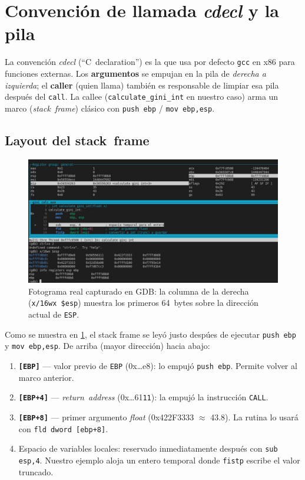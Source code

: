 \documentclass[a4paper,12pt]{article}
\begin{document}
\section{Convención de llamada \emph{cdecl} y la pila}
La convención \emph{cdecl} (``C declaration'') es la que usa por defecto
\texttt{gcc} en x86 para funciones externas.  
Los \textbf{argumentos} se empujan en la pila de \emph{derecha a izquierda};
el \textbf{caller} (quien llama) también es responsable de limpiar esa pila
después del \texttt{call}.  
La callee (\texttt{calculate\_gini\_int} en nuestro caso) arma un marco
(\emph{stack frame}) clásico con \texttt{push ebp} / \texttt{mov ebp,esp}.

\subsection{Layout del stack frame}
\begin{figure}[H]
  \centering
  \includegraphics[width=.9\textwidth]{images/stack_frame.jpeg}
  \caption{Fotograma real capturado en GDB: la columna de la derecha
           (\texttt{x/16wx \$esp}) muestra los primeros 64~bytes sobre la
           dirección actual de \texttt{ESP}.}\label{fig:layout_frame}
\end{figure}

Como se muestra en \cref{fig:layout_frame}, el stack frame se leyó justo despúes de ejecutar
\lstinline{push ebp} y \lstinline{mov ebp,esp}.  
De arriba (mayor dirección) hacia abajo:

\begin{enumerate}
  \item \textbf{\texttt{[EBP]}} — valor previo de \texttt{EBP} (0x\ldots{}e8):
        lo empujó \lstinline{push ebp}. Permite volver al marco anterior.
  \item \textbf{\texttt{[EBP+4]}} — \emph{return address}
        (0x\ldots{}61\texttt{11}): la empujó la instrucción \texttt{CALL}.
  \item \textbf{\texttt{[EBP+8]}} — primer argumento
        \textit{float} (0x422F3333 $\approx$ 43.8).  
        La rutina lo usará con \lstinline{fld dword [ebp+8]}.
  \item Espacio de variables locales: reservado inmediatamente
        después con \lstinline{sub esp,4}. Nuestro ejemplo aloja un entero
        temporal donde \lstinline{fistp} escribe el valor truncado.
\end{enumerate}
\end{document}

